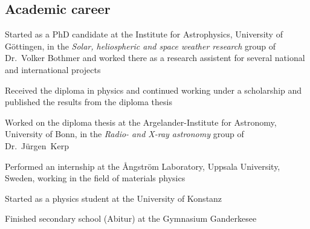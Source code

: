 \subsection*{Academic career}
\begin{description}[itemsep=3ex, leftmargin=1.5cm, style=sameline, align=parleft]
	\item[2012] Started as a PhD candidate at the Institute for Astrophysics, University of Göttingen, in the \textit{Solar, heliospheric and space weather research} group of Dr.~Volker Bothmer and worked there as a research assistent for several national and international projects
	\item[2011] Received the diploma in physics and continued working under a scholarship and published the results from the diploma thesis
	\item[2010] Worked on the diploma thesis at the Argelander-Institute for Astronomy, University of Bonn, in the \textit{Radio- and X-ray astronomy} group of Dr.~Jürgen~Kerp
	\item[2008] Performed an internship at the \AA{}ngström Laboratory, Uppsala University, Sweden, working in the field of materials physics
	\item[2004] Started as a physics student at the University of Konstanz
	\item[2003] Finished secondary school (Abitur) at the Gymnasium Ganderkesee
\end{description}
